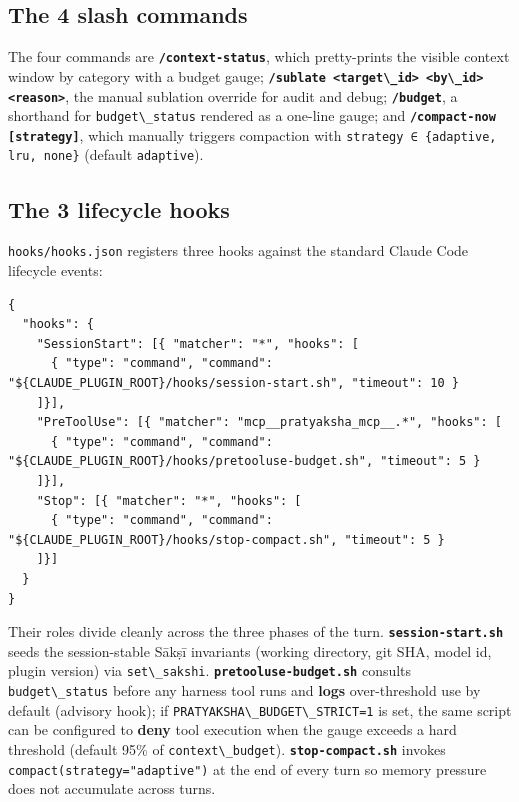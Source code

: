 \subsection{The 4 slash commands}\label{the-4-slash-commands}

The four commands are \textbf{\passthrough{\lstinline!/context-status!}}, which pretty-prints the visible context window by category with a budget gauge; \textbf{\passthrough{\lstinline!/sublate <target\_id> <by\_id> <reason>!}}, the manual sublation override for audit and debug; \textbf{\passthrough{\lstinline!/budget!}}, a shorthand for \passthrough{\lstinline!budget\_status!} rendered as a one-line gauge; and \textbf{\passthrough{\lstinline!/compact-now [strategy]!}}, which manually triggers compaction with \passthrough{\lstinline!strategy ∈ \{adaptive, lru, none\}!} (default \passthrough{\lstinline!adaptive!}).

\subsection{The 3 lifecycle hooks}\label{the-3-lifecycle-hooks}

\passthrough{\lstinline!hooks/hooks.json!} registers three hooks against the standard Claude Code lifecycle events:

\begin{lstlisting}
{
  "hooks": {
    "SessionStart": [{ "matcher": "*", "hooks": [
      { "type": "command", "command": "${CLAUDE_PLUGIN_ROOT}/hooks/session-start.sh", "timeout": 10 }
    ]}],
    "PreToolUse": [{ "matcher": "mcp__pratyaksha_mcp__.*", "hooks": [
      { "type": "command", "command": "${CLAUDE_PLUGIN_ROOT}/hooks/pretooluse-budget.sh", "timeout": 5 }
    ]}],
    "Stop": [{ "matcher": "*", "hooks": [
      { "type": "command", "command": "${CLAUDE_PLUGIN_ROOT}/hooks/stop-compact.sh", "timeout": 5 }
    ]}]
  }
}
\end{lstlisting}

Their roles divide cleanly across the three phases of the turn. \textbf{\passthrough{\lstinline!session-start.sh!}} seeds the session-stable Sākṣī invariants (working directory, git SHA, model id, plugin version) via \passthrough{\lstinline!set\_sakshi!}. \textbf{\passthrough{\lstinline!pretooluse-budget.sh!}} consults \passthrough{\lstinline!budget\_status!} before any harness tool runs and \textbf{logs} over-threshold use by default (advisory hook); if \passthrough{\lstinline!PRATYAKSHA\_BUDGET\_STRICT=1!} is set, the same script can be configured to \textbf{deny} tool execution when the gauge exceeds a hard threshold (default 95\% of \passthrough{\lstinline!context\_budget!}). \textbf{\passthrough{\lstinline!stop-compact.sh!}} invokes \passthrough{\lstinline!compact(strategy="adaptive")!} at the end of every turn so memory pressure does not accumulate across turns.

